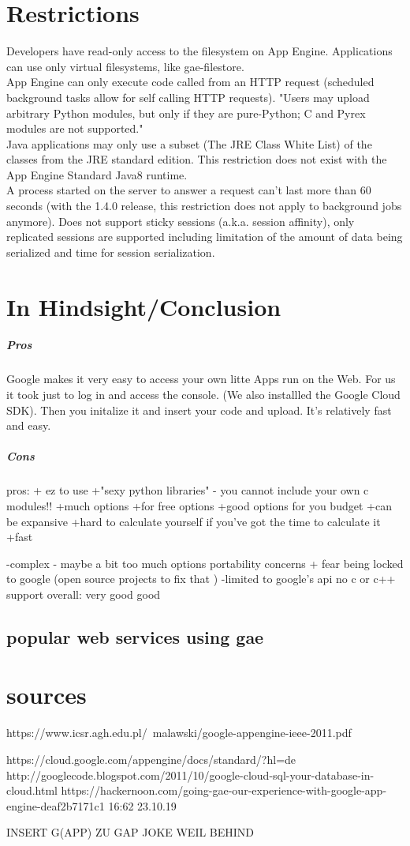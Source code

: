 \documentclass{article}
\begin{document}
\section{Restrictions}
    Developers have read-only access to the filesystem on App Engine. Applications can use only virtual filesystems, like gae-filestore.\\
    App Engine can only execute code called from an HTTP request (scheduled background tasks allow for self calling HTTP requests).
   "Users may upload arbitrary Python modules, but only if they are pure-Python; C and Pyrex modules are not supported."
    \\
    Java applications may only use a subset (The JRE Class White List) of the classes from the JRE standard edition. This restriction does not exist with the App Engine Standard Java8 runtime.
    \\
    A process started on the server to answer a request can't last more than 60 seconds (with the 1.4.0 release, this restriction does not apply to background jobs anymore).
    Does not support sticky sessions (a.k.a. session affinity), only replicated sessions are supported including limitation of the amount of data being serialized and time for session serialization.
    
\section{In Hindsight/Conclusion}

\subparagraph{Pros}
Google makes it very easy to access your own litte Apps run on the Web. For us it took just to log in and access the console. (We also installled the Google Cloud SDK). Then you initalize it and insert your code and upload. It's relatively fast and easy.

\subparagraph{Cons}
pros: + ez to use
      +"sexy python libraries"
      - you cannot include your own c modules!!
      +much options
      +for free options
      +good options for you budget 
      +can be expansive 
      +hard to calculate yourself if you've got the time to calculate it
      +fast
      
      -complex
      - maybe a bit too much options 
      portability concerns + fear being locked to google (open source projects to fix that )
      -limited to google's api
      no c or c++ support 
      overall: very good good
      \subsection{popular web services using gae} 
      
      
\section{sources}
https://www.icsr.agh.edu.pl/~malawski/google-appengine-ieee-2011.pdf

https://cloud.google.com/appengine/docs/standard/?hl=de
http://googlecode.blogspot.com/2011/10/google-cloud-sql-your-database-in-cloud.html
https://hackernoon.com/going-gae-our-experience-with-google-app-engine-deaf2b7171c1 16:62 23.10.19


INSERT G(APP) ZU GAP JOKE WEIL BEHIND
\end{document}
